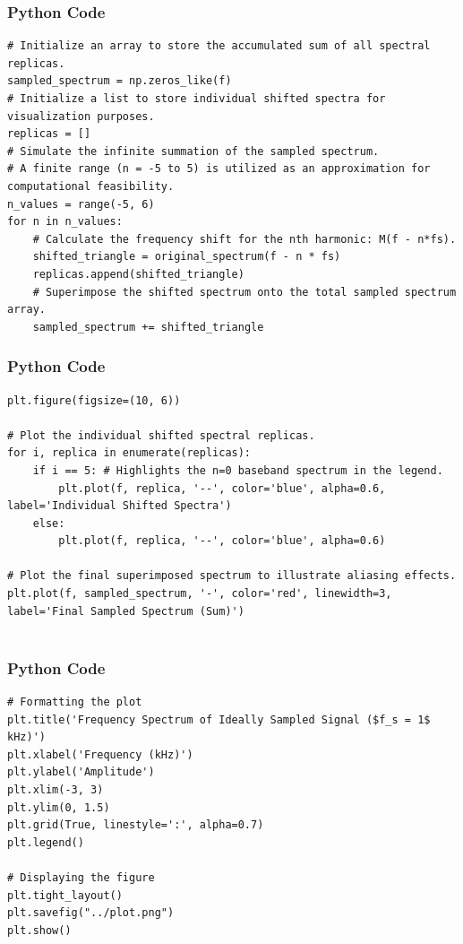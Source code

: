 \documentclass{beamer}
\begin{document}
\begin{frame}[fragile]
    \frametitle{Python Code }
    \begin{lstlisting}
# Initialize an array to store the accumulated sum of all spectral replicas.
sampled_spectrum = np.zeros_like(f)
# Initialize a list to store individual shifted spectra for visualization purposes.
replicas = []
# Simulate the infinite summation of the sampled spectrum.
# A finite range (n = -5 to 5) is utilized as an approximation for computational feasibility.
n_values = range(-5, 6)
for n in n_values:
    # Calculate the frequency shift for the nth harmonic: M(f - n*fs).
    shifted_triangle = original_spectrum(f - n * fs)
    replicas.append(shifted_triangle)
    # Superimpose the shifted spectrum onto the total sampled spectrum array.
    sampled_spectrum += shifted_triangle

\end{lstlisting}
\end{frame}

\begin{frame}[fragile]
    \frametitle{Python Code }
    \begin{lstlisting}
plt.figure(figsize=(10, 6))

# Plot the individual shifted spectral replicas.
for i, replica in enumerate(replicas):
    if i == 5: # Highlights the n=0 baseband spectrum in the legend.
        plt.plot(f, replica, '--', color='blue', alpha=0.6, label='Individual Shifted Spectra')
    else:
        plt.plot(f, replica, '--', color='blue', alpha=0.6)

# Plot the final superimposed spectrum to illustrate aliasing effects.
plt.plot(f, sampled_spectrum, '-', color='red', linewidth=3, label='Final Sampled Spectrum (Sum)')


\end{lstlisting}
\end{frame}

\begin{frame}[fragile]
    \frametitle{Python Code }
    \begin{lstlisting}
# Formatting the plot
plt.title('Frequency Spectrum of Ideally Sampled Signal ($f_s = 1$ kHz)')
plt.xlabel('Frequency (kHz)')
plt.ylabel('Amplitude')
plt.xlim(-3, 3)
plt.ylim(0, 1.5)
plt.grid(True, linestyle=':', alpha=0.7)
plt.legend()

# Displaying the figure
plt.tight_layout()
plt.savefig("../plot.png")
plt.show()
\end{lstlisting}
\end{frame}
\end{document}
